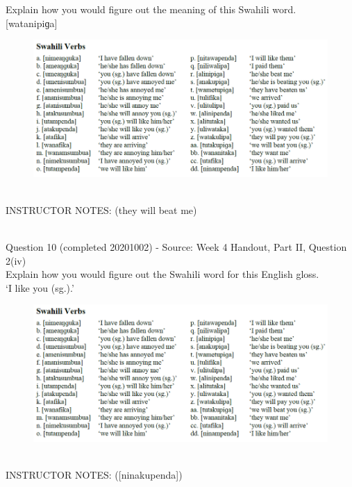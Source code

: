 \documentclass[12pt]{article}
\begin{document}
Explain how you would figure out the meaning of this Swahili word.\\

{[watanipiɡa]}

\begin{figure}[H]
\includegraphics{../images/swahiliverbs.png}
\end{figure}

~\\
INSTRUCTOR NOTES: (they will beat me)


~\\

{\large Question 10} (completed 20201002) - Source: Week 4 Handout, Part II, Question 2(iv)\\

Explain how you would figure out the Swahili word for this English gloss.\\

‘I like you (sg.).’

\begin{figure}[H]
\includegraphics{../images/swahiliverbs.png}
\end{figure}

~\\
INSTRUCTOR NOTES: ([ninakupenda])


~\\
\end{document}
